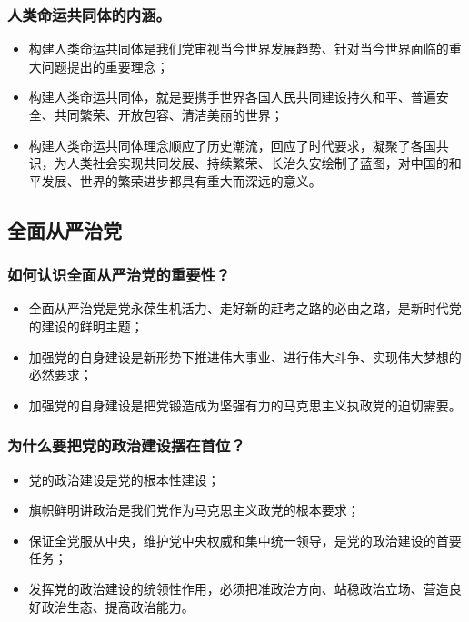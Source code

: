 \documentclass{article}
\begin{document}
\subsubsection{人类命运共同体的内涵。}
\begin{itemize}
    \item 构建人类命运共同体是我们党审视当今世界发展趋势、针对当今世界面临的重大问题提出的重要理念；
    \item 构建人类命运共同体，就是要携手世界各国人民共同建设持久和平、普遍安全、共同繁荣、开放包容、清洁美丽的世界；
    \item 构建人类命运共同体理念顺应了历史潮流，回应了时代要求，凝聚了各国共识，为人类社会实现共同发展、持续繁荣、长治久安绘制了蓝图，对中国的和平发展、世界的繁荣进步都具有重大而深远的意义。
\end{itemize}

\subsection{全面从严治党}

\subsubsection{如何认识全面从严治党的重要性？}
\begin{itemize}
    \item 全面从严治党是党永葆生机活力、走好新的赶考之路的必由之路，是新时代党的建设的鲜明主题；
    \item 加强党的自身建设是新形势下推进伟大事业、进行伟大斗争、实现伟大梦想的必然要求；
    \item 加强党的自身建设是把党锻造成为坚强有力的马克思主义执政党的迫切需要。
\end{itemize}

\subsubsection{为什么要把党的政治建设摆在首位？}
\begin{itemize}
    \item 党的政治建设是党的根本性建设；
    \item 旗帜鲜明讲政治是我们党作为马克思主义政党的根本要求；
    \item 保证全党服从中央，维护党中央权威和集中统一领导，是党的政治建设的首要任务；
    \item 发挥党的政治建设的统领性作用，必须把准政治方向、站稳政治立场、营造良好政治生态、提高政治能力。
\end{itemize}
\end{document}
